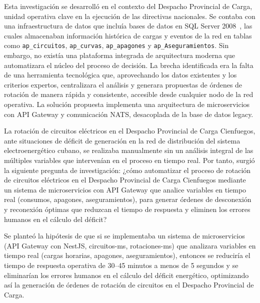 Esta investigación se desarrolló en el contexto del Despacho Provincial de Carga, unidad operativa clave en la ejecución de las directivas nacionales. Se contaba con una infraestructura de datos que incluía bases de datos en SQL Server 2008~\citep{jones2019}, las cuales almacenaban información histórica de cargas y eventos de la red en tablas como \texttt{ap\_circuitos}, \texttt{ap\_curvas}, \texttt{ap\_apagones} y \texttt{ap\_Aseguramientos}. Sin embargo, no existía una plataforma integrada de arquitectura moderna que automatizara el núcleo del proceso de decisión. La brecha identificada era la falta de una herramienta tecnológica que, aprovechando los datos existentes y los criterios expertos, centralizara el análisis y generara propuestas de órdenes de rotación de manera rápida y consistente, accesible desde cualquier nodo de la red operativa. La solución propuesta implementa una arquitectura de microservicios con API Gateway y comunicación NATS, desacoplada de la base de datos legacy.

La rotación de circuitos eléctricos en el Despacho Provincial de Carga Cienfuegos, ante situaciones de déficit de generación en la red de distribución del sistema electroenergético cubano, se realizaba manualmente sin un análisis integral de las múltiples variables que intervenían en el proceso en tiempo real. Por tanto, surgió la siguiente pregunta de investigación: ¿cómo automatizar el proceso de rotación de circuitos eléctricos en el Despacho Provincial de Carga Cienfuegos mediante un sistema de microservicios con API Gateway que analice variables en tiempo real (consumos, apagones, aseguramientos), para generar órdenes de desconexión y reconexión óptimas que reduzcan el tiempo de respuesta y eliminen los errores humanos en el cálculo del déficit?

Se planteó la hipótesis de que si se implementaba un sistema de microservicios (API Gateway con NestJS, circuitos-ms, rotaciones-ms) que analizara variables en tiempo real (cargas horarias, apagones, aseguramientos), entonces se reduciría el tiempo de respuesta operativa de 30–45 minutos a menos de 5 segundos y se eliminarían los errores humanos en el cálculo del déficit energético, optimizando así la generación de órdenes de rotación de circuitos en el Despacho Provincial de Carga.

